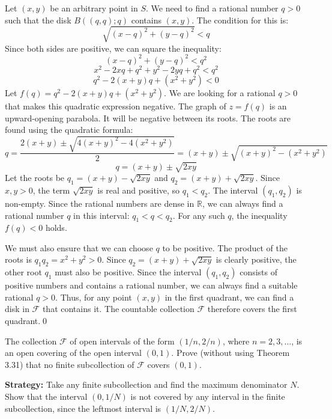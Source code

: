 Let $(x, y)$ be an arbitrary point in $S$. We need to find a rational number $q > 0$ such that the disk $B((q,q); q)$ contains $(x, y)$. The condition for this is:
$$\sqrt{(x-q)^2 + (y-q)^2} < q$$
Since both sides are positive, we can square the inequality:
$$(x-q)^2 + (y-q)^2 < q^2$$
$$x^2 - 2xq + q^2 + y^2 - 2yq + q^2 < q^2$$
$$q^2 - 2(x+y)q + (x^2+y^2) < 0$$
Let $f(q) = q^2 - 2(x+y)q + (x^2+y^2)$. We are looking for a rational $q > 0$ that makes this quadratic expression negative. The graph of $z=f(q)$ is an upward-opening parabola. It will be negative between its roots. The roots are found using the quadratic formula:
$$q = \frac{2(x+y) \pm \sqrt{4(x+y)^2 - 4(x^2+y^2)}}{2} = (x+y) \pm \sqrt{(x+y)^2 - (x^2+y^2)}$$
$$q = (x+y) \pm \sqrt{2xy}$$
Let the roots be $q_1 = (x+y) - \sqrt{2xy}$ and $q_2 = (x+y) + \sqrt{2xy}$. Since $x,y > 0$, the term $\sqrt{2xy}$ is real and positive, so $q_1 < q_2$. The interval $(q_1, q_2)$ is non-empty.
Since the rational numbers are dense in $\mathbb{R}$, we can always find a rational number $q$ in this interval: $q_1 < q < q_2$. For any such $q$, the inequality $f(q) < 0$ holds.

We must also ensure that we can choose $q$ to be positive. The product of the roots is $q_1 q_2 = x^2+y^2 > 0$. Since $q_2 = (x+y) + \sqrt{2xy}$ is clearly positive, the other root $q_1$ must also be positive.
Since the interval $(q_1, q_2)$ consists of positive numbers and contains a rational number, we can always find a suitable rational $q > 0$.
Thus, for any point $(x,y)$ in the first quadrant, we can find a disk in $\mathcal{F}$ that contains it. The countable collection $\mathcal{F}$ therefore covers the first quadrant.\qed


\begin{problembox}
\begin{problemstatement}
The collection \( \mathcal{F} \) of open intervals of the form \( (1/n, 2/n) \), where \( n = 2, 3, \ldots \), is an open covering of the open interval \( (0, 1) \). Prove (without using Theorem 3.31) that no finite subcollection of \( \mathcal{F} \) covers \( (0, 1) \).
\end{problemstatement}
\end{problembox}

\noindent\textbf{Strategy:} Take any finite subcollection and find the maximum denominator $N$. Show that the interval $(0, 1/N)$ is not covered by any interval in the finite subcollection, since the leftmost interval is $(1/N, 2/N)$.

